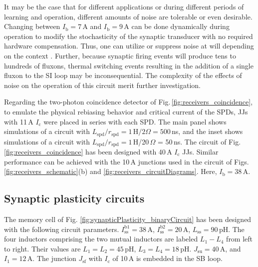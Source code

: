 \documentclass[twocolumn]{article}
\begin{document}
It may be the case that for different applications or during different periods of learning and operation, different amounts of noise are tolerable or even desirable. Changing between $I_{\mathrm{b}} = 7$\,\textmu A and $I_{\mathrm{b}} = 9$\,\textmu A can be done dynamically during operation to modify the stochasticity of the synaptic transducer with no required hardware compensation. Thus, one can utilize or suppress noise at will depending on the context \cite{vrso1996,vora2005,stgo2005}. Further, because synaptic firing events will produce tens to hundreds of fluxons, thermal switching events resulting in the addition of a single fluxon to the SI loop may be inconsequential. The complexity of the effects of noise on the operation of this circuit merit further investigation.

Regarding the two-photon coincidence detector of Fig.\,\ref{fig:receivers_coincidence}, to emulate the physical rebiasing behavior and critical current of the SPDs, JJs with 11\,\textmu A $I_{\mathrm{c}}$ were placed in series with each SPD. The main panel shows simulations of a circuit with $L_{\mathrm{spd}}/r_{\mathrm{spd}} = 1$\,\textmu H$/2\Omega = 500$\,ns, and the inset shows simulations of a circuit with $L_{\mathrm{spd}}/r_{\mathrm{spd}} = 1$\,\textmu H/20\,$\Omega$ = 50\,ns. The circuit of Fig.\,\ref{fig:receivers_coincidence} has been designed with 40\,\textmu A $I_{\mathrm{c}}$ JJs. Similar performance can be achieved with the 10\,\textmu A junctions used in the circuit of Figs.\,\ref{fig:receivers_schematic}(b) and \ref{fig:receivers_circuitDiagrams}. Here, $I_{\mathrm{b}} = 38$\,\textmu A. 

\subsection{Synaptic plasticity circuits}
The memory cell of Fig. \ref{fig:synapticPlasticity_binaryCircuit} has been designed with the following circuit parameters. $I_{\mathrm{ss}}^{\mathrm{b1}} = 38$\,\textmu A, $I_{\mathrm{ss}}^{\mathrm{b2}} = 20$\,\textmu A, $L_{\mathrm{ss}} = 90$\,pH. The four inductors comprising the two mutual inductors are labeled $L_1-L_4$ from left to right. Their values are $L_1=L_2=45$\,pH, $L_3=L_4=18$\,pH. $J_{\mathrm{su}} = 40$\,\textmu A, and $I_1 = 12$\,\textmu A. The junction $J_{\mathrm{sf}}$ with $I_{\mathrm{c}}$ of 10\,\textmu A is embedded in the SB loop. 
\end{document}

